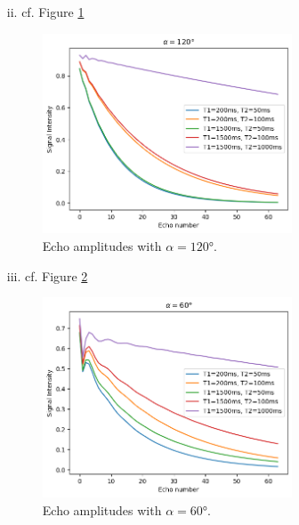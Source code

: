 \documentclass{article}
\begin{document}
\begin{itemize}
\begin{itemize}
            \item[ii.] cf. Figure \ref{fig:1_a_ii} %
            
                \begin{figure}[]
                    \centering
                    \includegraphics[width=0.7\textwidth]{figures/1_a_ii.png}
                    \caption{Echo amplitudes with $\alpha=120$°.}
                    \label{fig:1_a_ii}
                \end{figure}
            
            \item[iii.] cf. Figure \ref{fig:1_a_iii} %
            
                \begin{figure}[]
                    \centering
                    \includegraphics[width=0.7\textwidth]{figures/1_a_iii.png}
                    \caption{Echo amplitudes with $\alpha=60$°.}
                    \label{fig:1_a_iii}
                \end{figure}


\end{itemize}
\end{itemize}
\end{document}
